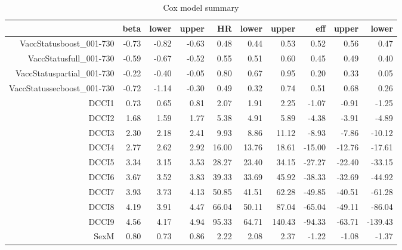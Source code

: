 \begin{table}[ht]
\centering
\begin{tabular}{rrrrrrrrrr}
  \hline
 & beta & lower & upper & HR & lower & upper & eff & upper & lower \\ 
  \hline
VaccStatusboost\_001-730 & -0.73 & -0.82 & -0.63 & 0.48 & 0.44 & 0.53 & 0.52 & 0.56 & 0.47 \\ 
  VaccStatusfull\_001-730 & -0.59 & -0.67 & -0.52 & 0.55 & 0.51 & 0.60 & 0.45 & 0.49 & 0.40 \\ 
  VaccStatuspartial\_001-730 & -0.22 & -0.40 & -0.05 & 0.80 & 0.67 & 0.95 & 0.20 & 0.33 & 0.05 \\ 
  VaccStatussecboost\_001-730 & -0.72 & -1.14 & -0.30 & 0.49 & 0.32 & 0.74 & 0.51 & 0.68 & 0.26 \\ 
  DCCI1 & 0.73 & 0.65 & 0.81 & 2.07 & 1.91 & 2.25 & -1.07 & -0.91 & -1.25 \\ 
  DCCI2 & 1.68 & 1.59 & 1.77 & 5.38 & 4.91 & 5.89 & -4.38 & -3.91 & -4.89 \\ 
  DCCI3 & 2.30 & 2.18 & 2.41 & 9.93 & 8.86 & 11.12 & -8.93 & -7.86 & -10.12 \\ 
  DCCI4 & 2.77 & 2.62 & 2.92 & 16.00 & 13.76 & 18.61 & -15.00 & -12.76 & -17.61 \\ 
  DCCI5 & 3.34 & 3.15 & 3.53 & 28.27 & 23.40 & 34.15 & -27.27 & -22.40 & -33.15 \\ 
  DCCI6 & 3.67 & 3.52 & 3.83 & 39.33 & 33.69 & 45.92 & -38.33 & -32.69 & -44.92 \\ 
  DCCI7 & 3.93 & 3.73 & 4.13 & 50.85 & 41.51 & 62.28 & -49.85 & -40.51 & -61.28 \\ 
  DCCI8 & 4.19 & 3.91 & 4.47 & 66.04 & 50.11 & 87.04 & -65.04 & -49.11 & -86.04 \\ 
  DCCI9 & 4.56 & 4.17 & 4.94 & 95.33 & 64.71 & 140.43 & -94.33 & -63.71 & -139.43 \\ 
  SexM & 0.80 & 0.73 & 0.86 & 2.22 & 2.08 & 2.37 & -1.22 & -1.08 & -1.37 \\ 
   \hline
\end{tabular}
\caption{Cox model summary} 
\end{table}

